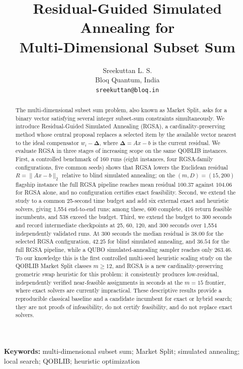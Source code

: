 \documentclass[11pt]{article}
\title{Residual-Guided Simulated Annealing for\\
Multi-Dimensional Subset Sum}
\author{Sreekuttan L. S.\\
Bloq Quantum, India\\
\texttt{sreekuttan@bloq.in}}
\date{}
\newcommand{\res}{\boldsymbol{\Delta}}
\begin{document}
\maketitle

\begin{abstract}
The multi-dimensional subset sum problem, also known as Market Split, asks for a binary vector satisfying several integer subset-sum constraints simultaneously. We introduce Residual-Guided Simulated Annealing (RGSA), a cardinality-preserving method whose central proposal replaces a selected item by the available vector nearest to the ideal compensator $w_i-\res$, where $\res=Ax-b$ is the current residual. We evaluate RGSA in three stages of increasing scope on the same QOBLIB instances. First, a controlled benchmark of 160 runs (eight instances, four RGSA-family configurations, five common seeds) shows that RGSA lowers the Euclidean residual $R=\|Ax-b\|_2$ relative to blind simulated annealing; on the $(m,D)=(15,200)$ flagship instance the full RGSA pipeline reaches mean residual $100.37$ against $104.06$ for RGSA alone, and no configuration certifies exact feasibility. Second, we extend the study to a common 25-second time budget and add six external exact and heuristic solvers, giving 1,554 end-to-end runs; among these, 600 complete, 416 return feasible incumbents, and 538 exceed the budget. Third, we extend the budget to 300 seconds and record intermediate checkpoints at 25, 60, 120, and 300 seconds over 1,554 independently validated runs. At 300 seconds the median residual is $38.00$ for the selected RGSA configuration, $42.25$ for blind simulated annealing, and $36.54$ for the full RGSA pipeline, while a QUBO simulated-annealing sampler reaches only $263.46$. To our knowledge this is the first controlled multi-seed heuristic scaling study on the QOBLIB Market Split classes $m\geq12$, and RGSA is a new cardinality-preserving geometric swap heuristic for this problem: it consistently produces low-residual, independently verified near-feasible assignments in seconds at the $m=15$ frontier, where exact solvers are currently impractical. These descriptive results provide a reproducible classical baseline and a candidate incumbent for exact or hybrid search; they are not proofs of infeasibility, do not certify feasibility, and do not replace exact solvers.
\end{abstract}

\noindent\textbf{Keywords:} multi-dimensional subset sum; Market Split; simulated annealing; local search; QOBLIB; heuristic optimization
\end{document}
